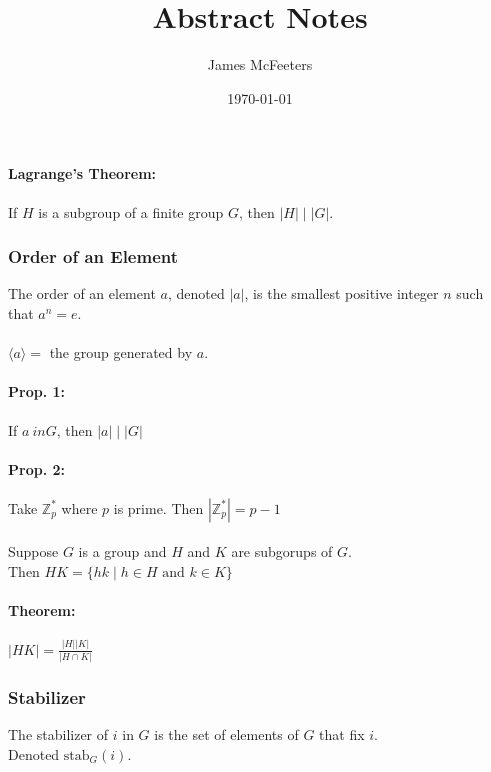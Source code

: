 \documentclass[11pt, twoside, letterpaper]{article}
\newcommand{\ord}[1]{|{#1}|}
\newcommand{\stab}{\mathrm{stab}}
\newcommand{\ordiv}[2]{\ord{{#1}} \mid \ord{{#2}}}
\newcommand{\genby}[1]{\langle {#1} \rangle}
\begin{document}
\title{Abstract Notes}
\author{James McFeeters}
\date{\today}
\maketitle


\paragraph{Lagrange's Theorem: }
	If $H$ is a subgroup of a finite group $G$, then $\ordiv{H}{G}$.

\subsubsection{Order of an Element}
	The order of an element $a$, denoted $\ord{a}$, is the smallest positive integer $n$ such that $a^n = e$.

\paragraph{}
	$\genby{a} = $ the group generated by $a$.

\paragraph{Prop. 1: }
	If $a \ in G$, then $\ordiv{a}{G}$

\paragraph{Prop. 2: }
	Take $\mathbb{Z}_p^*$ where $p$ is prime.
	Then $\ord{\mathbb{Z}_p^*} = p-1$
\paragraph{}
	Suppose $G$ is a group and $H$ and $K$ are subgorups of $G$. \\
	Then $HK = \{ hk \mid h \in H \text{ and } k \in K \}$

\paragraph{Theorem: }
	$\ord{HK} = \displaystyle\frac{\ord{H}\ord{K}}{\ord{H \cap K}}$

\subsubsection{Stabilizer}
	The stabilizer of $i$ in $G$ is the set of elements of $G$ that fix $i$. \\
	Denoted $\stab_G (i)$.
\end{document}
